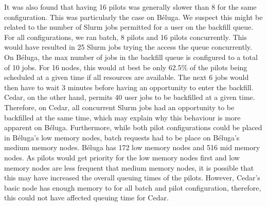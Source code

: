 \documentclass{IEEEtran}
\begin{document}
It was also found that having 16 pilots was generally slower than 8 for the same
configuration. This was particularly the case on B\'eluga. We suspect this might be
related to the number of Slurm jobs permitted for a user on the backfill queue. For
all configurations, we ran batch, 8 pilots and 16 pilots concurrently. This would have
resulted in 25 Slurm jobs trying the access the queue concurrently. On
B\'eluga, the max number of jobs in the backfill queue is configured to a
total of 10 jobs. For 16 nodes, this would at best be only 62.5\% of the
pilots being scheduled at a given time if all resources are available.
The next 6 jobs would then have to wait 3 minutes before having an opportunity to enter the
backfill. Cedar, on the other hand, permits 40 user jobs to be backfilled at a given time.
Therefore, on Cedar, all concurrent Slurm jobs had an opportunity to be backfilled at
the same time, which may explain why this behaviour is more apparent on B\'eluga. Furthermore,
while both pilot configurations could be placed in B\'eluga's low memory nodes, batch requests
had to be place on B\'eluga's medium memory nodes. B\'eluga has 172 low memory nodes and
516 mid memory nodes. As pilots would get priority for the low memory nodes first and 
low memory nodes are less frequent that medium memory nodes, it is possible that this
may have increased the overall queuing times of the pilots. However, Cedar's basic
node has enough memory to for all batch and pilot configuration, therefore, this could not
have affected queuing time for Cedar.
\end{document}
